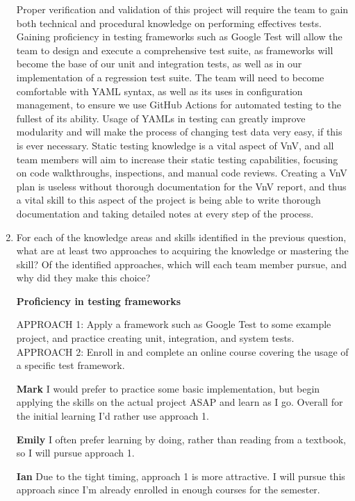 \documentclass[12pt, titlepage]{article}
\begin{document}
\begin{enumerate}[leftmargin=*]
  \vspace{5pt}
  Proper verification and validation of this project will require the team to gain both technical 
  and procedural knowledge on performing effectives tests. Gaining proficiency in testing frameworks 
  such as Google Test will allow the team to design and execute a comprehensive test suite, as 
  frameworks will become the base of our unit and integration tests, as well as in our implementation 
  of a regression test suite. The team will need to become comfortable with YAML syntax, as well as 
  its uses in configuration management, to ensure we use GitHub Actions for automated testing to the 
  fullest of its ability. Usage of YAMLs in testing can greatly improve modularity and will make the 
  process of changing test data very easy, if this is ever necessary. Static testing knowledge is a 
  vital aspect of VnV, and all team members will aim to increase their static testing capabilities, 
  focusing on code walkthroughs, inspections, and manual code reviews. Creating a VnV plan is useless 
  without thorough documentation for the VnV report, and thus a vital skill to this aspect of the project 
  is being able to write thorough documentation and taking detailed notes at every step of the process.

  \item For each of the knowledge areas and skills identified in the previous
  question, what are at least two approaches to acquiring the knowledge or
  mastering the skill?  Of the identified approaches, which will each team
  member pursue, and why did they make this choice? 

  \vspace{5pt}
  \textbf{Proficiency in testing frameworks}

  APPROACH 1: Apply a framework such as Google Test to some example project, and practice creating unit, 
  integration, and system tests. \\
  APPROACH 2: Enroll in and complete an online course covering the usage of a specific test framework.
  
  \textbf{Mark} I would prefer to practice some basic implementation, but begin applying the skills on the 
  actual project ASAP and learn as I go. Overall for the initial learning I’d rather use approach 1.

  \textbf{Emily} I often prefer learning by doing, rather than reading from a textbook, so I will pursue 
  approach 1.

  \textbf{Ian} Due to the tight timing, approach 1 is more attractive. I will pursue this approach since 
  I’m already enrolled in enough courses for the semester.


\end{enumerate}
\end{document}
